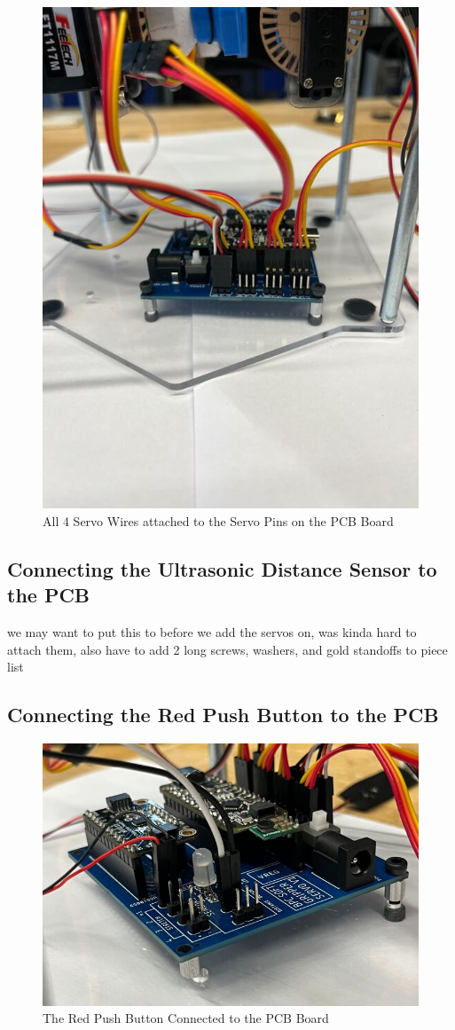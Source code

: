 \documentclass{article}
\begin{document}
\begin{figure}[H]
    \centering
    \includegraphics[width=0.5\linewidth]{PCBImages/ServoWires/servo_wires_2.jpg}
    \caption{All 4 Servo Wires attached to the Servo Pins on the PCB Board}
    \label{fig:enter-label}
\end{figure}



\subsection{Connecting the Ultrasonic Distance Sensor to the PCB}



we may want to put this to before we add the servos on, was kinda hard to attach them, also have to add 2 long screws, washers, and gold standoffs to piece list



\subsection{Connecting the Red Push Button to the PCB}

\begin{figure}[H]
    \centering
    \includegraphics[width=0.5\linewidth]{PCBImages/RedButtonWiring/red_button_wiring_1.jpg}
    \caption{The Red Push Button Connected to the PCB Board}
    \label{fig:enter-label}
\end{figure}
\end{document}
